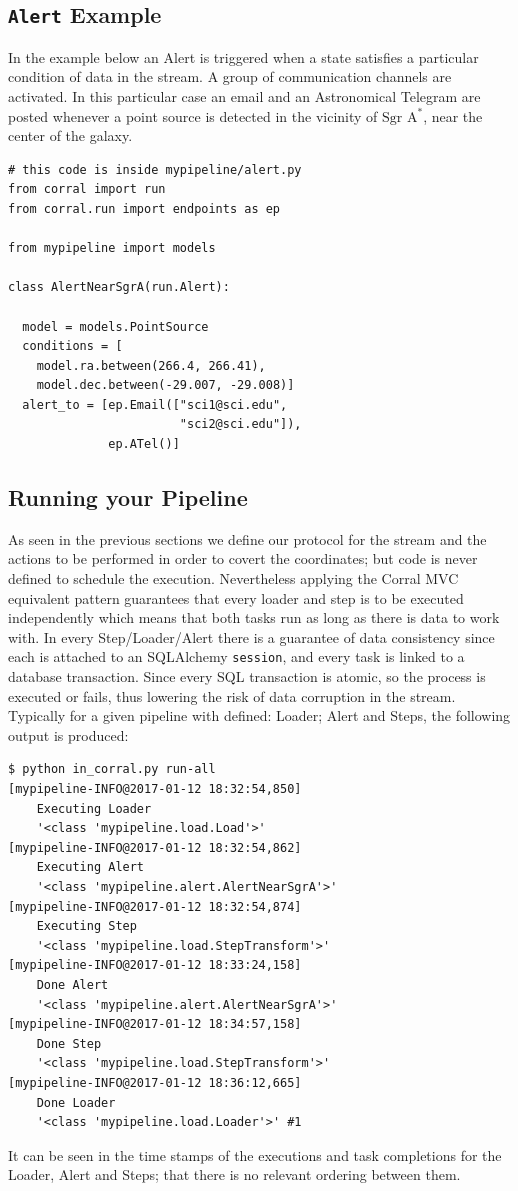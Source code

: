 \documentclass[final,5p,times,twocolumn,authoryear]{elsarticle}
\begin{document}
\subsection{\texttt{Alert} Example}
%
In the example below an Alert is triggered when a
state satisfies a particular condition of data in the stream. A group of communication channels are activated.
In this particular case an email and an Astronomical Telegram
\citep{rutledge1998astronomer} are posted
whenever a point source is detected in the vicinity of $\textrm{Sgr A}^{*}$,
near the center of the galaxy.
%
\begin{verbatim}
# this code is inside mypipeline/alert.py
from corral import run
from corral.run import endpoints as ep

from mypipeline import models

class AlertNearSgrA(run.Alert):

  model = models.PointSource
  conditions = [
    model.ra.between(266.4, 266.41),
    model.dec.between(-29.007, -29.008)]
  alert_to = [ep.Email(["sci1@sci.edu",
                        "sci2@sci.edu"]),
              ep.ATel()]
\end{verbatim}
%
%
\subsection{Running your Pipeline}
%
As seen in the previous sections we define our protocol for the stream and
the actions to be performed in order to covert the coordinates; but code is never defined
to schedule the execution. Nevertheless applying the Corral MVC equivalent pattern
guarantees that every loader and step is to be executed independently which means that both tasks
run as long as there is data to work with.
%
In every Step/Loader/Alert there is a guarantee of data consistency since each is attached to an SQLAlchemy \texttt{session}, and every task is linked to a database transaction. Since every SQL transaction is atomic, so
the process is executed or fails, thus lowering the risk of data corruption in the stream.
\newpage
Typically for a given pipeline with defined: Loader; Alert and Steps, the following output is produced:
%
\begin{verbatim}
$ python in_corral.py run-all
[mypipeline-INFO@2017-01-12 18:32:54,850]
    Executing Loader
    '<class 'mypipeline.load.Load'>'
[mypipeline-INFO@2017-01-12 18:32:54,862]
    Executing Alert
    '<class 'mypipeline.alert.AlertNearSgrA'>'
[mypipeline-INFO@2017-01-12 18:32:54,874]
    Executing Step
    '<class 'mypipeline.load.StepTransform'>'
[mypipeline-INFO@2017-01-12 18:33:24,158]
    Done Alert
    '<class 'mypipeline.alert.AlertNearSgrA'>'
[mypipeline-INFO@2017-01-12 18:34:57,158]
    Done Step
    '<class 'mypipeline.load.StepTransform'>'
[mypipeline-INFO@2017-01-12 18:36:12,665]
    Done Loader
    '<class 'mypipeline.load.Loader'>' #1
\end{verbatim}
%
It can be seen in the time stamps of the executions and task completions for the
Loader, Alert and Steps; that there is no relevant ordering between them.
%
%
\end{document}
